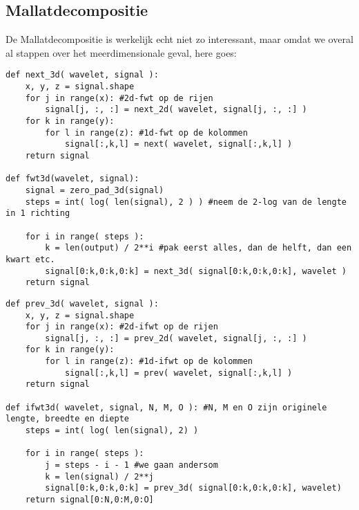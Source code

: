 \subsection{Mallatdecompositie}
De Mallatdecompositie is werkelijk echt niet zo interessant, maar omdat we overal al stappen over het meerdimensionale geval, here goes:
\begin{lstlisting}[caption=De Mallatdecompositie in 3 dimensies]
def next_3d( wavelet, signal ):
	x, y, z = signal.shape
	for j in range(x): #2d-fwt op de rijen
		signal[j, :, :] = next_2d( wavelet, signal[j, :, :] )
	for k in range(y):
		for l in range(z): #1d-fwt op de kolommen
			signal[:,k,l] = next( wavelet, signal[:,k,l] )
	return signal

def fwt3d(wavelet, signal):
	signal = zero_pad_3d(signal)
	steps = int( log( len(signal), 2 ) ) #neem de 2-log van de lengte in 1 richting
	
	for i in range( steps ):
		k = len(output) / 2**i #pak eerst alles, dan de helft, dan een kwart etc.
		signal[0:k,0:k,0:k] = next_3d( signal[0:k,0:k,0:k], wavelet )
	return signal
\end{lstlisting}
\begin{lstlisting}[caption=De omgekeerde Mallatdecompositie in 3 dimensies]
def prev_3d( wavelet, signal ):
	x, y, z = signal.shape
	for j in range(x): #2d-ifwt op de rijen
		signal[j, :, :] = prev_2d( wavelet, signal[j, :, :] )
	for k in range(y):
		for l in range(z): #1d-ifwt op de kolommen
			signal[:,k,l] = prev( wavelet, signal[:,k,l] )
	return signal

def ifwt3d( wavelet, signal, N, M, O ): #N, M en O zijn originele lengte, breedte en diepte
	steps = int( log( len(signal), 2) )
	
	for i in range( steps ):
		j = steps - i - 1 #we gaan andersom
		k = len(signal) / 2**j
		signal[0:k,0:k,0:k] = prev_3d( signal[0:k,0:k,0:k], wavelet)
	return signal[0:N,0:M,0:O]
\end{lstlisting}


